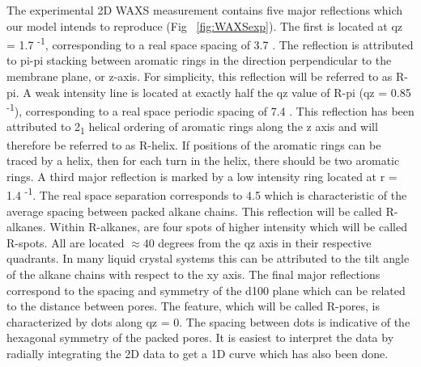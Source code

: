 The experimental 2D WAXS measurement contains five major reflections which
our model intends to reproduce (Fig ~\ref{fig:WAXSexp}). The first is located
at qz = 1.7 \angstrom \textsuperscript{-1}, corresponding to a real space 
spacing of 3.7 \angstrom. The reflection is attributed to pi-pi stacking
between aromatic rings in the direction perpendicular to the membrane plane, or z-axis. 
For simplicity, this reflection will be referred to as R-pi. A weak intensity
line is located at exactly half the qz value of R-pi (qz = 0.85 \angstrom \textsuperscript{-1}), corresponding to a 
real space periodic spacing of 7.4 \angstrom. This reflection has been 
attributed to 2\textsubscript{1} helical ordering of aromatic rings along the
z axis and will therefore be referred to as R-helix. If positions of the 
aromatic rings can be traced by a helix, then for each turn in the helix, 
there should be two aromatic rings. A third major reflection is marked by 
a low intensity ring located at r = 1.4 \angstrom \textsuperscript{-1}. The
real space separation corresponds to 4.5 \angstrom which is characteristic
of the average spacing between packed alkane chains. This reflection will be
called R-alkanes. Within R-alkanes, are four spots of higher intensity which 
will be called R-spots. All are located $\approx 40$ degrees from the qz axis
in their respective quadrants. In many liquid crystal systems this can be
attributed to the tilt angle of the alkane chains with respect to the xy axis. 
The final major reflections correspond to the spacing and symmetry of the d100 
plane which can be related to the distance between pores. The feature, which 
will be called R-pores, is characterized by dots along qz = 0. The spacing
between dots is indicative of the hexagonal symmetry of the packed pores. It
is easiest to interpret the data by radially integrating the 2D data to get 
a 1D curve which has also been done.

